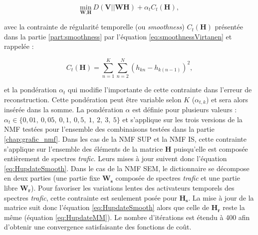 \begin{equation}
\underset{\textbf{W},\textbf{H}}{\text{min}}~D\left(\textbf{V} \vert\vert \textbf{WH}\right) + \alpha_t C_t(\mathbf{H}),
\end{equation}


avec la contrainte de régularité temporelle (ou \textit{smoothness}) $C_t(\mathbf{H})$ présentée dans la partie \ref{part:smoothness} par l'équation \ref{eq:smoothnessVirtanen} et rappelée : 

\begin{equation}
C_t(\mathbf{H}) = \sum_{n=1}^K \sum_{n=2}^N \left(h_{kn} - h_{k(n-1)}\right)^2,
\end{equation}

et la pondération $\alpha_t$ qui modifie l'importante de cette contrainte dans l'erreur de reconstruction. Cette pondération peut être variable selon $K$ ($\alpha_{t,k}$) et sera alors insérée dans la somme.
La pondération $\alpha$ est définie pour plusieurs valeurs : $\alpha_t \in \lbrace 0,01,~ 0,05,~ 0,1,~ 0,5,~ 1,~2,~3,~5 \rbrace$ et s'applique sur les trois versions de la NMF testées pour l'ensemble des combinaisons testées dans la partie \ref{chap:grafic_nmf}. Dans les cas de la NMF SUP et la NMF IS, cette contrainte s'applique sur l'ensemble des éléments de la matrice $\mathbf{H}$ puisqu'elle est composée entièrement de spectres \textit{trafic}. Leurs mises à jour suivent donc l'équation \ref{eq:HupdateSmooth}. Dans le cas de la NMF SEM, le dictionnaire se décompose en deux parties (une partie fixe $\mathbf{W_s}$ composée de spectres \textit{trafic} et une partie libre $\mathbf{W_r}$). Pour favoriser les variations lentes des activateurs temporels des spectres \textit{trafic}, cette contrainte est seulement posée pour $\mathbf{H_s}$. La mise à jour de la matrice suit donc l'équation \ref{eq:HupdateSmooth} alors que celle de $\mathbf{H_r}$ reste la même (équation \ref{eq:HupdateMM}). Le nombre d'itérations est étendu à 400 afin d'obtenir une convergence satisfaisante des fonctions de coût. 

